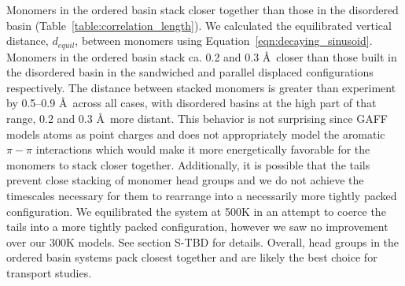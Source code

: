 \documentclass[journal=jpcbfk,manuscript=article]{achemso}
\begin{document}
  Monomers in the ordered basin stack closer together than those in the
  disordered basin (Table~\ref{table:correlation_length}). We calculated the
  equilibrated vertical distance, $\mathit{d}_{equil}$, between monomers using
  Equation~\ref{eqn:decaying_sinusoid}. Monomers in the ordered basin stack ca.
  0.2 and 0.3 \AA~closer than those built in the disordered basin in the
  sandwiched and parallel displaced configurations respectively. The distance
  between stacked monomers is greater than experiment by 0.5--0.9 \AA~across all
  cases, with disordered basins at the high part of that range, 0.2 and 0.3
  \AA~more distant.
  This behavior is not surprising since GAFF models atoms as point charges and
  does not appropriately model the aromatic $\pi-\pi$ interactions which would
  make it more energetically favorable for the monomers to stack closer together.
  Additionally, it is possible that the tails prevent close stacking of monomer
  head groups and we do not achieve the timescales necessary for them to
  rearrange into a necessarily more tightly packed configuration. We equilibrated
  the system at 500K in an attempt to coerce the tails into a more tightly packed
  configuration, however we saw no improvement over our 300K models. See section
  S-TBD for details. Overall, head groups in the ordered basin systems pack 
  closest together and are likely the best choice for transport studies. 

  
\end{document}
